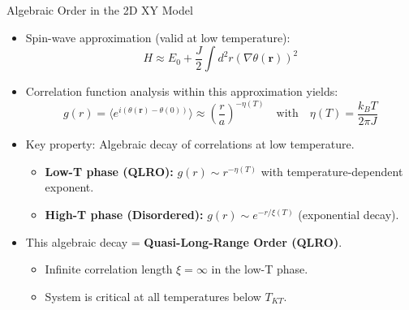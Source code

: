 \documentclass[11pt,aspectratio=169]{beamer}
\newcommand\mathalert[1]{{\color{accentcolor}#1}}
\begin{document}
\begin{frame}{Algebraic Order in the 2D XY Model}
    \begin{itemize}
        \item Spin-wave approximation (valid at low temperature):
        \begin{equation}
            H \approx E_0 + \frac{J}{2} \int d^2r (\nabla \theta(\mathbf{r}))^2
        \end{equation}
        \pause
        \item Correlation function analysis within this approximation yields:
        \begin{equation}
            g(r) = \langle e^{i(\theta(\mathbf{r}) - \theta(0))} \rangle \approx \left( \frac{r}{a} \right)^{-\eta(T)} \quad \text{with} \quad \eta(T) = \frac{k_B T}{2\pi J}
        \end{equation}
        \item Key property: \mathalert{Algebraic decay} of correlations at low temperature.
        \begin{itemize}
            \item \textbf{Low-T phase (QLRO):} $g(r) \sim r^{-\eta(T)}$ with temperature-dependent exponent.
            \item \textbf{High-T phase (Disordered):} $g(r) \sim e^{-r/\xi(T)}$ (exponential decay).
        \end{itemize}
        \pause
        \item This algebraic decay = \textbf{Quasi-Long-Range Order (QLRO)}.
        \begin{itemize}
            \item Infinite correlation length $\xi = \infty$ in the low-T phase.
            \item System is critical at all temperatures below $T_{KT}$.
        \end{itemize}
    \end{itemize}
\end{frame}
\end{document}
